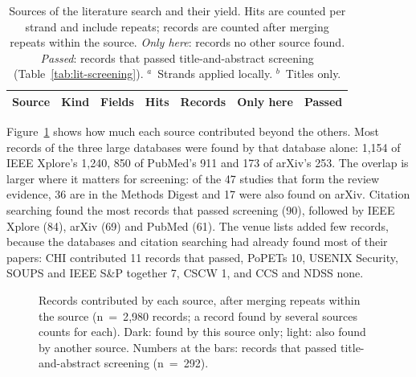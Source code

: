 \begin{table}[tbp]
\centering
\begin{singlespace}
\caption[Sources of the literature search and their yield]{Sources of the
literature search and their yield. Hits are counted per strand and include
repeats; records are counted after merging repeats within the source.
\emph{Only here}: records no other source found. \emph{Passed}: records that
passed title-and-abstract screening (Table~\ref{tab:lit-screening}).
$^a$~Strands applied locally. $^b$~Titles only.}
\label{tab:lit-sources}
\footnotesize
\setlength{\tabcolsep}{3.5pt}
\begin{tabularx}{\textwidth}{@{}>{\raggedright\arraybackslash}p{2.2cm}l>{\raggedright\arraybackslash}p{1.9cm}>{\raggedright\arraybackslash}Xrrr@{}}
\toprule
\textbf{Source} & \textbf{Kind} & \textbf{Fields} & \textbf{Hits} & \textbf{Records} & \textbf{Only here} & \textbf{Passed} \\
\midrule
\end{tabularx}
\end{singlespace}
\end{table}

Figure~\ref{fig:lit-sources} shows how much each source contributed beyond the
others. Most records of the three large databases were found by that database
alone:
1{,}154 of IEEE Xplore's 1{,}240, 850 of PubMed's 911 and 173 of arXiv's 253.
The overlap is larger where it matters for screening: of the 47 studies that
form the review evidence, 36 are in the Methods Digest and 17 were also found
on arXiv. Citation searching found the most records that passed screening
(90), followed by IEEE Xplore (84), arXiv (69) and PubMed (61). The venue lists
added few records, because the databases and citation searching had already
found most of their papers: CHI contributed 11 records that passed, PoPETs 10,
USENIX Security, SOUPS and IEEE S\&P together 7, CSCW 1, and CCS and NDSS none.

\begin{figure}[tbp]
\centering

\caption[Records contributed by each source]{Records contributed by each
source, after merging repeats within the source (n~=~2{,}980 records; a record
found by several sources counts for each). Dark: found by this source only;
light: also found by another source. Numbers at the bars: records that passed
title-and-abstract screening (n~=~292).}
\label{fig:lit-sources}
\end{figure}


